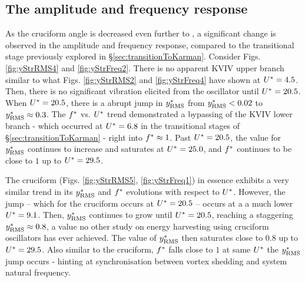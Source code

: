 \documentclass[oneside]{utmthesis}
\begin{document}
\subsection{The amplitude and frequency response}\label{ssec:kvivAmpFreqResp}
As the cruciform angle is decreased even further to \angtw{}, a significant change is observed in the amplitude and frequency response, compared to the transitional stage previously explored in \S\ref{sec:transitionToKarman}. Consider Figs. \ref{fig:yStrRMS4} and \ref{fig:yStrFreq2}. There is no apparent KVIV upper branch similar to what  Figs. \ref{fig:yStrRMS2} and \ref{fig:yStrFreq4} have shown at $U^{*} = 4.5$. Then, there is no significant vibration elicited from the oscillator until $U^{*} = 20.5$. When $U^{*} = 20.5$, there is a abrupt jump in $y^{*}_{\text{RMS}}$ from $y^{*}_{\text{RMS}} < 0.02$ to $y^{*}_{\text{RMS}} \approx 0.3$. The $f^{*}$ vs. $U^{*}$ trend demonstrated a bypassing of the KVIV lower branch - which occurred at $U^{*} = 6.8$ in the transitional stages of \S\ref{sec:transitionToKarman} - right into $f^{*} \approx 1$. Past $U^{*} = 20.5$, the value for $y^{*}_{\text{RMS}}$ continues to increase and saturates at $U^{*} = 25.0$, and $f^{*}$ continues to be close to $1$ up to $U^{*} = 29.5$.

The \angon{} cruciform (Figs. \ref{fig:yStrRMS5}, \ref{fig:yStrFreq1}) in essence exhibits a very similar trend in its $y^{*}_{\text{RMS}}$ and $f^{*}$ evolutions with respect to $U^{*}$. However, the jump -- which for the \angtw{} cruciform occurs at $U^{*} = 20.5$ -- occurs at a a much lower $U^{*} = 9.1$. Then, $y^{*}_{\text{RMS}}$ continues to grow until $U^{*} = 20.5$, reaching a staggering $y^{*}_{\text{RMS}} \approx 0.8$, a value no other study on energy harvesting using cruciform oscillators has ever achieved. The value of $y^{*}_{\text{RMS}}$ then saturates close to $0.8$ up to $U^{*} = 29.5$. Also similar to the \angtw{} cruciform, $f^{*}$ falls close to $1$ at same $U^{*}$ the $y^{*}_{\text{RMS}}$ jump occurs - hinting at synchronisation between vortex shedding and system natural frequency.
\end{document}
